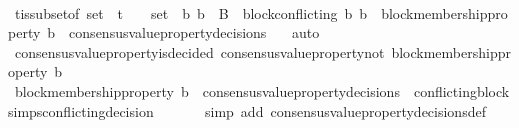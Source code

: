 \begin{isabellebody}
\ \ \ \ \ \isamarkupfalse%
\ {\isasymSigma}t{\isacharunderscore}is{\isacharunderscore}subset{\isacharunderscore}of{\isacharunderscore}{\isasymSigma}\ {\isacartoucheopen}{\isasymsigma}{\isacharunderscore}set\ {\isasymsubseteq}\ {\isasymSigma}t{\isacartoucheclose}\ {\isacartoucheopen}{\isacharbraceleft}{\isasymsigma}{\isacharcomma}\ {\isasymsigma}{\isacharprime}{\isacharbraceright}\ {\isasymsubseteq}\ {\isasymsigma}{\isacharunderscore}set\ {\isasymand}\ {\isacharbraceleft}b{}{\isacharcomma}\ b{}{\isacharbraceright}\ {\isasymsubseteq}\ B\ {\isasymand}\ block{\isacharunderscore}conflicting\ {\isacharparenleft}b{}{\isacharcomma}\ b{}{\isacharparenright}\ {\isasymand}\ block{\isacharunderscore}membership{\isacharunderscore}property\ b{}\ {\isasymin}\ consensus{\isacharunderscore}value{\isacharunderscore}property{\isacharunderscore}decisions\ {\isasymsigma}{\isacartoucheclose}\ \isamarkupfalse%
\ auto\isanewline
\ \ \ \isamarkupfalse%
\ {\isachardoublequoteopen}consensus{\isacharunderscore}value{\isacharunderscore}property{\isacharunderscore}is{\isacharunderscore}decided\ {\isacharparenleft}consensus{\isacharunderscore}value{\isacharunderscore}property{\isacharunderscore}not\ {\isacharparenleft}block{\isacharunderscore}membership{\isacharunderscore}property\ b{}{\isacharparenright}{\isacharcomma}\ {\isasymsigma}{\isacharprime}{\isacharparenright}{\isachardoublequoteclose}\isanewline
\ \ \ \ \ \isamarkupfalse%
\ {\isacartoucheopen}block{\isacharunderscore}membership{\isacharunderscore}property\ b{}\ {\isasymin}\ consensus{\isacharunderscore}value{\isacharunderscore}property{\isacharunderscore}decisions\ {\isasymsigma}{\isacharprime}{\isacartoucheclose}\ conflicting{\isacharunderscore}blocks{\isacharunderscore}imps{\isacharunderscore}conflicting{\isacharunderscore}decision\isanewline
\ \ \ \ \ \isamarkupfalse%
\ {\isacharparenleft}simp\ add{\isacharcolon}\ consensus{\isacharunderscore}value{\isacharunderscore}property{\isacharunderscore}decisions{\isacharunderscore}def{\isacharparenright}\isanewline
\ \ \ \ \ \isamarkupfalse%

\end{isabellebody}
